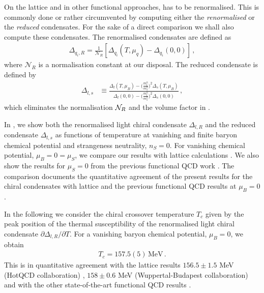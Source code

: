 \documentclass[reprint,twocolumn,superscriptaddress,preprintnumbers,amsmath,amssymb,aps,prd,floatfix]{revtex4-2}
\begin{document}
On the lattice and in other functional approaches,  has to be renormalised. This is commonly done or rather circumvented by computing either the \textit{renormalised} or the \textit{reduced} condensates. For the sake of a  direct comparison we shall also compute these condensates. The renormalised condensates are defined as 
%
\begin{align}
\Delta_{q_i,R}=\frac{1}{\mathcal{N}_R}[\Delta_{q_i}(T,\mu_q)-\Delta_{q_i}(0,0)]\,,
\label{eq:DeltaR}
\end{align}
%
where $\mathcal{N}_R$ is a normalisation constant at our disposal. The reduced condensate is defined by  
%
\begin{align}
\Delta_{l,s}&\equiv\frac{\Delta_{l}(T,\mu_B)-\Big( \frac{m_l^0}{m_s^0} \Big)^2 \Delta_s(T,\mu_B)}{\Delta_{l}(0,0)-\Big( \frac{m_l^0}{m_s^0} \Big)^2 \Delta_s(0,0)}\,, 
\label{eq:Deltals}
\end{align}
%
which eliminates the normalisation ${\cal N}_R$ and the volume factor in  . 

In , we show both the renormalised light chiral condensate $\Delta_{l,R}$ and the reduced condensate $\Delta_{l,s}$ as functions of temperature at vanishing and finite baryon chemical potential and strangeness neutrality, $n_S=0$.  For vanishing chemical potential,  $\mu_B=0=\mu_S$, we compare our results with lattice calculations \cite{Borsanyi:2010bp}. We also show the results for $\mu_S=0$ from the previous functional QCD work \cite{Fu:2019hdw}. 
The comparison documents the quantitative agreement of the present results for the chiral condensates with lattice and the previous functional QCD results at $\mu_B=0$. 

In the following we consider the chiral crossover temperature $T_c$ given by the peak position of the thermal susceptibility of the renormalised light chiral condensate $\partial \Delta_{l, R}/\partial T$. For a vanishing baryon chemical potential, $\mu_B=0$, we obtain 
%
\begin{align} 
T_{c} =157.5(5)\,\textrm{MeV}\,.
\label{eq:TcMuB0}
\end{align} 
%
This is in quantitative agreement with the lattice results $156.5 \pm 1.5$ MeV  (HotQCD collaboration) \cite{HotQCD:2018pds}, $158 \pm 0.6$ MeV (Wuppertal-Budapest collaboration) \cite{Borsanyi:2020fev} and with the other state-of-the-art functional QCD results \cite{Fu:2019hdw, Gao:2020fbl, Gunkel:2021oya, Pawlowski:2025jpg}. 
\end{document}
